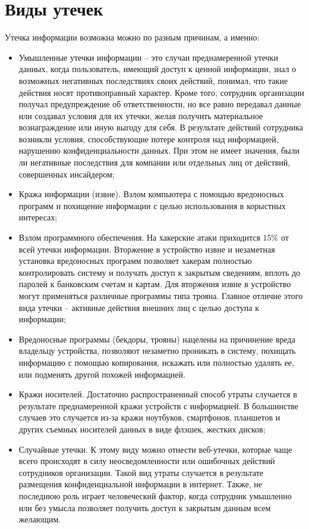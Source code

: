 \section{Виды утечек}

Утечка информации возможна можно по разным причинам, а именно:

\begin{itemize}
	\item
		Умышленные утечки информации – это случаи преднамеренной утечки данных, когда пользователь, имеющий доступ к ценной информации, знал о возможных негативных последствиях своих действий, понимал, что такие действия носят противоправный характер. Кроме того, сотрудник организации получал предупреждение об ответственности, но все равно передавал данные или создавал условия для их утечки, желая получить материальное вознаграждение или иную выгоду для себя. В результате действий сотрудника возникли условия, способствующие потере контроля над информацией, нарушению конфиденциальности данных. При этом не имеет значения, были ли негативные последствия для компании или отдельных лиц от действий, совершенных инсайдером;

	\item
		Кража информации (извне). Взлом компьютера с помощью вредоносных программ и похищение информации с целью использования в корыстных интересах;  
	\item
		Взлом программного обеспечения. На хакерские атаки приходится 15\% от всей утечки информации. Вторжение в устройство извне и незаметная установка вредоносных программ позволяет хакерам полностью контролировать систему и получать доступ к закрытым сведениям, вплоть до паролей к банковским счетам и картам. Для вторжения извне в устройство могут применяться различные программы типа трояна. Главное отличие этого вида утечки – активные действия внешних лиц с целью доступа к информации; 
	\item 
	    Вредоносные программы (бекдоры, трояны) нацелены на причинение вреда владельцу устройства, позволяют незаметно проникать в систему, похищать информацию с помощью копирования, искажать или полностью удалять ее, или подменять другой похожей информацией. 
	\item 
	    Кражи носителей. Достаточно распространенный способ утраты случается в результате преднамеренной кражи устройств с информацией. В большинстве случаев это случается из-за кражи ноутбуков, смартфонов, планшетов и других съемных носителей данных в виде флэшек, жестких дисков;
	\item 
	    Случайные утечки. К этому виду можно отнести веб-утечки, которые чаще всего происходят в силу неосведомленности или ошибочных действий сотрудников организации. Такой вид утраты случается в результате размещения конфиденциальной информации в интернет. Также, не последнюю роль играет человеческий фактор, когда сотрудник умышленно или без умысла позволяет получить доступ к закрытым данным всем желающим.
\end{itemize}

